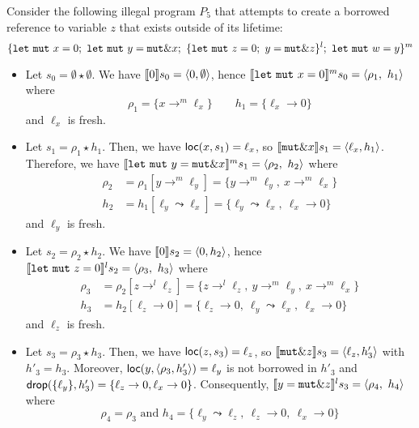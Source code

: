 \begin{example}
  Consider the following illegal program $P_5$ that attempts to create
  a borrowed reference to variable $z$ that exists outside of its lifetime:
  {\small
  \[
    \{
      \mathtt{let\ mut}\ x = 0;\
      \mathtt{let\ mut}\ y = \mathtt{mut}\borrow x;\
      \{\mathtt{let\ mut}\ z = 0;\ y = \mathtt{mut}\borrow z\}^l;\
      \mathtt{let\ mut}\ w = y
    \}^m
  \]}
  \begin{itemize}
    \item Let $s_0=\emptyset \star \emptyset$.
    We have $\den[0]{s_0} = \langle 0,\emptyset\rangle$, hence
    $\denl[\mathtt{let\ mut}\ x = 0]{m}{s_0} =
    \langle \rho_1,\ h_1\rangle$ where
    \[\rho_1=\{x\to^m\ell_x\} \qquad
    h_1 = \{\ell_x\to 0\}\]
    and $\ell_x$ is fresh.
    \item Let $s_1 = \rho_1 \star h_1$.
    Then, we have $\loc(x,s_1) = \ell_x$, so
    $\den[\mathtt{mut}\borrow x]{s_1} = \langle\ell_x, h_1\rangle$.
    Therefore, we have
    $\denl[\mathtt{let\ mut}\ y = \mathtt{mut}\borrow x]{m}{s_1} =
    \langle \rho_2,\ h_2\rangle$
    where
    \begin{align*}
      \rho_2 & = \rho_1[y\to^m\ell_y] = \{y\to^m\ell_y,\ x\to^m\ell_x\}\\
      h_2 & = h_1[\ell_y\leadsto \ell_x] =
      \{\ell_y\leadsto \ell_x,\ \ell_x\to 0\}
    \end{align*}
    and $\ell_y$ is fresh.
    \item Let $s_2 = \rho_2 \star h_2$.
    We have $\den[0]{s_2} = \langle 0,h_2\rangle$, hence
    $\denl[\mathtt{let\ mut}\ z = 0]{l}{s_2} =
    \langle \rho_3,\ h_3\rangle$ where
    \begin{align*}
      \rho_3 & = \rho_2[z\to^l\ell_z] =
      \{z\to^l\ell_z,\ y\to^m\ell_y,\ x\to^m\ell_x\}\\
      h_3 & = h_2[\ell_z\to 0] =
      \{\ell_z\to 0,\ \ell_y\leadsto \ell_x,\ \ell_x\to 0\}
    \end{align*}
    and $\ell_z$ is fresh.
    \item Let $s_3 = \rho_3 \star h_3$.
    Then, we have $\loc(z,s_3) = \ell_z$, so
    $\den[\mathtt{mut}\borrow z]{s_3} = \langle\ell_z, h'_3\rangle$
    with $h'_3=h_3$.
    Moreover, $\loc(y,\langle \rho_3,h'_3\rangle) = \ell_y$ is not
    borrowed in $h'_3$ and $\drop(\{\ell_y\},h'_3) =
    \{\ell_z\to 0,\ell_x\to 0\}$. Consequently,
    $\denl[y = \mathtt{mut}\borrow z]{l}{s_3} = \langle \rho_4,\ h_4\rangle$
    where
    \[\rho_4=\rho_3 \text{ and }
    h_4=\{\ell_y\leadsto\ell_z,\ \ell_z\to 0,\ \ell_x\to 0\}\]

\end{itemize}
\end{example}
